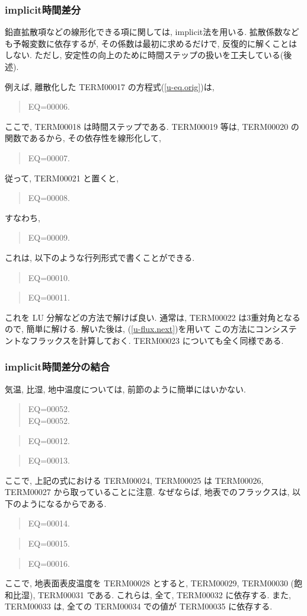 \subsubsection{implicit時間差分}

鉛直拡散項などの線形化できる項に関しては, implicit法を用いる.
拡散係数なども予報変数に依存するが,
その係数は最初に求めるだけで, 反復的に解くことはしない.
ただし, 安定性の向上のために時間ステップの扱いを工夫している(後述). 

例えば, 離散化した TERM00017 の方程式(\ref{u-eq.orig})は,
%
\begin{quote}
EQ=00006.
\end{quote}
ここで, TERM00018 は時間ステップである.
TERM00019 等は, TERM00020 の関数であるから, その依存性を線形化して,
%
\begin{quote}
EQ=00007.
\label{u-flux.next}
\end{quote}

従って, TERM00021 と置くと,
%
\begin{quote}
EQ=00008.
\end{quote}
%
すなわち,
\begin{quote}
EQ=00009.
\end{quote}

これは, 以下のような行列形式で書くことができる.
%
\begin{quote}
EQ=00010.
\end{quote}
%
\begin{quote}
EQ=00011.
\label{u-matrix}
\end{quote}
%
これを LU 分解などの方法で解けば良い.
通常は, TERM00022 は3重対角となるので, 簡単に解ける.
解いた後は, (\ref{u-flux.next})を用いて
この方法にコンシステントなフラックスを計算しておく.
TERM00023 についても全く同様である.

\subsubsection{implicit時間差分の結合}

気温, 比湿, 地中温度については, 前節のように簡単にはいかない.
%
\begin{quote}
\nonumber
EQ=00052.\\
\label{deq-theta}
EQ=00052.
\end{quote}
%
\begin{quote}
EQ=00012.
\label{deq-q}
\end{quote}
%
\begin{quote}
EQ=00013.
\label{deq-g}
\end{quote}
%
ここで, 上記の式における TERM00024, TERM00025 は
TERM00026, TERM00027 から取っていることに注意. なぜならば,
地表でのフラックスは, 以下のようになるからである.
\begin{quote}
EQ=00014.
\end{quote}
\begin{quote}
EQ=00015.
\end{quote}
\begin{quote}
EQ=00016.
\end{quote}
ここで, 地表面表皮温度を TERM00028 とすると,
TERM00029, TERM00030 (飽和比湿), TERM00031 である.
これらは, 全て, TERM00032 に依存する.
また, TERM00033 は, 全ての TERM00034 での値が TERM00035 に依存する. 

